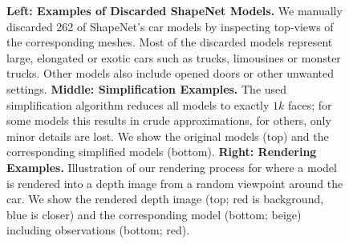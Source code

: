 \begin{figure}
\begin{subfigure}[t]{0.31\textwidth}
\begin{subfigure}[t]{0.475\textwidth}
        \end{subfigure}
    \end{subfigure}
    \caption{{\bf Left: Examples of Discarded ShapeNet Models.} We manually discarded 262 of ShapeNet's \cite{Chang2015ARXIV} car models by inspecting top-views of the corresponding meshes. Most of the discarded models represent large, elongated or exotic cars such as trucks, limousines or monster trucks. Other models also include opened doors or other unwanted settings. {\bf Middle: Simplification Examples.} The used simplification algorithm \cite{Guney2015CVPR} reduces all models to exactly $1k$ faces; for some models this results in crude approximations, for others, only minor details are lost. We show the original models (top) and the corresponding simplified models (bottom). {\bf Right: Rendering Examples.} Illustration of our rendering process for \clean where a model is rendered into a depth image from a random viewpoint around the car. We show the rendered depth image (top; {\color{red}red} is background, {\color{blue}blue} is closer) and the corresponding model (bottom; {\color{rbeige}beige}) including observations (bottom; {\color{rred}red}).}
    \label{fig:appendix-experiments-shapenet}
\end{figure}